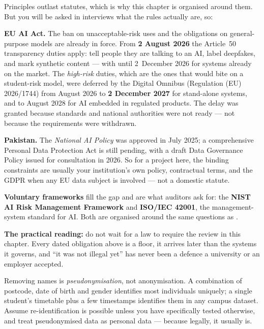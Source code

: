 \begin{conceptbox}
Principles outlast statutes, which is why this chapter is organised around them.
But you will be asked in interviews what the rules actually are, so:

\begin{tight}
  \item \textbf{EU AI Act.} The ban on unacceptable-risk uses and the obligations
        on general-purpose models are already in force. From \textbf{2 August 2026}
        the Article~50 transparency duties apply: tell people they are talking to
        an AI, label deepfakes, and mark synthetic content --- with until
        2~December 2026 for systems already on the market. The \emph{high-risk}
        duties, which are the ones that would bite on a student-risk model, were
        deferred by the Digital Omnibus (Regulation (EU) 2026/1744) from August
        2026 to \textbf{2 December 2027} for stand-alone systems, and to August
        2028 for AI embedded in regulated products. The delay was granted because
        standards and national authorities were not ready --- not because the
        requirements were withdrawn.
  \item \textbf{Pakistan.} The \emph{National AI Policy} was approved in July 2025;
        a comprehensive Personal Data Protection Act is still pending, with a draft
        Data Governance Policy issued for consultation in 2026. So for a project
        here, the binding constraints are usually your institution's own policy,
        contractual terms, and the GDPR when any EU data subject is involved ---
        not a domestic statute.
  \item \textbf{Voluntary frameworks} fill the gap and are what auditors ask for:
        the \textbf{NIST AI Risk Management Framework} and \textbf{ISO/IEC 42001},
        the management-system standard for AI. Both are organised around the same
        questions as .
\end{tight}

\textbf{The practical reading:} do not wait for a law to require the review in this
chapter. Every dated obligation above is a floor, it arrives later than the systems
it governs, and ``it was not illegal yet'' has never been a defence a university or
an employer accepted.
\end{conceptbox}

\begin{alertbox}
Removing names is \emph{pseudonymisation}, not anonymisation. A combination of
postcode, date of birth and gender identifies most individuals uniquely; a single
student's timetable plus a few timestamps identifies them in any campus dataset.
Assume re-identification is possible unless you have specifically tested otherwise,
and treat pseudonymised data as personal data --- because legally, it usually is.
\end{alertbox}

